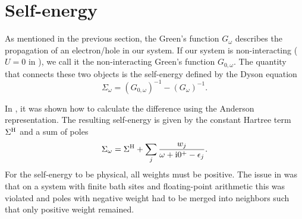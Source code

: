 \section{Self-energy}

As mentioned in the previous section,
the Green's function $G_\omega$ describes the propagation of an electron/hole in our system.
If our system is non-interacting ($U=0$ in ),
we call it the non-interacting Green's function $G_{0, \omega}$.
The quantity that connects these two objects is the self-energy defined by the Dyson equation
\begin{equation}
    \Sigma_\omega = (G_{0, \omega})^{-1} - (G_\omega)^{-1}.
\end{equation}

In \cite{Lu2014}, it was shown how to calculate the difference using the Anderson representation.
The resulting self-energy is given by the constant Hartree term $\Sigma^{\mathrm{H}}$ and a sum of poles
\begin{equation}
    \Sigma_\omega = \Sigma^{\mathrm{H}} + \sum_j \frac{w_j}{\omega + \mathrm{i}0^+ - \epsilon_j}.
    \label{eq:self-energy-sum-of-poles}
\end{equation}
For the self-energy to be physical, all weights must be positive.
The issue in \cite{Lu2014} was that
on a system with finite bath sites and floating-point arithmetic this was violated
and poles with negative weight had to be merged into neighbors
such that only positive weight remained.

